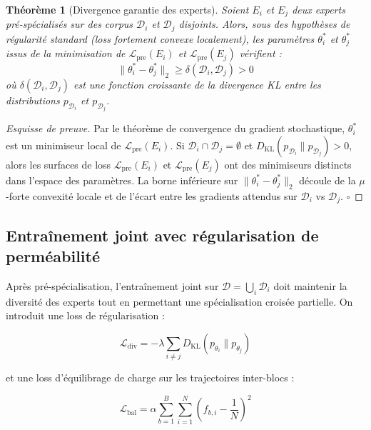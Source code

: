 \documentclass[10pt,a4paper]{article}
\newtheorem{theorem}{Théorème}
\begin{document}
\begin{theorem}[Divergence garantie des experts]
Soient $E_i$ et $E_j$ deux experts pré-spécialisés sur des corpus $\mathcal{D}_i$ et $\mathcal{D}_j$ disjoints. Alors, sous des hypothèses de régularité standard (loss fortement convexe localement), les paramètres $\theta_i^*$ et $\theta_j^*$ issus de la minimisation de $\mathcal{L}_{\text{pre}}(E_i)$ et $\mathcal{L}_{\text{pre}}(E_j)$ vérifient :
\begin{equation}
  \|\theta_i^* - \theta_j^*\|_2 \geq \delta(\mathcal{D}_i, \mathcal{D}_j) > 0
\end{equation}
où $\delta(\mathcal{D}_i, \mathcal{D}_j)$ est une fonction croissante de la divergence KL entre les distributions $p_{\mathcal{D}_i}$ et $p_{\mathcal{D}_j}$.
\end{theorem}

\begin{proof}[Esquisse de preuve]
Par le théorème de convergence du gradient stochastique, $\theta_i^*$ est un minimiseur local de $\mathcal{L}_{\text{pre}}(E_i)$. Si $\mathcal{D}_i \cap \mathcal{D}_j = \emptyset$ et $D_{\mathrm{KL}}(p_{\mathcal{D}_i} \| p_{\mathcal{D}_j}) > 0$, alors les surfaces de loss $\mathcal{L}_{\text{pre}}(E_i)$ et $\mathcal{L}_{\text{pre}}(E_j)$ ont des minimiseurs distincts dans l'espace des paramètres. La borne inférieure sur $\|\theta_i^* - \theta_j^*\|_2$ découle de la $\mu$-forte convexité locale et de l'écart entre les gradients attendus sur $\mathcal{D}_i$ vs $\mathcal{D}_j$. $\square$
\end{proof}

\subsection{Entraînement joint avec régularisation de perméabilité}

Après pré-spécialisation, l'entraînement joint sur $\mathcal{D} = \bigcup_i \mathcal{D}_i$ doit maintenir la diversité des experts tout en permettant une spécialisation croisée partielle. On introduit une loss de régularisation :

\begin{equation}
  \mathcal{L}_{\text{div}} = -\lambda \sum_{i \neq j} D_{\mathrm{KL}}\!\left(p_{\theta_i} \| p_{\theta_j}\right)
\end{equation}

et une loss d'équilibrage de charge sur les trajectoires inter-blocs :

\begin{equation}
  \mathcal{L}_{\text{bal}} = \alpha \sum_{b=1}^{B} \sum_{i=1}^{N} \left(f_{b,i} - \frac{1}{N}\right)^2
\end{equation}
\end{document}

